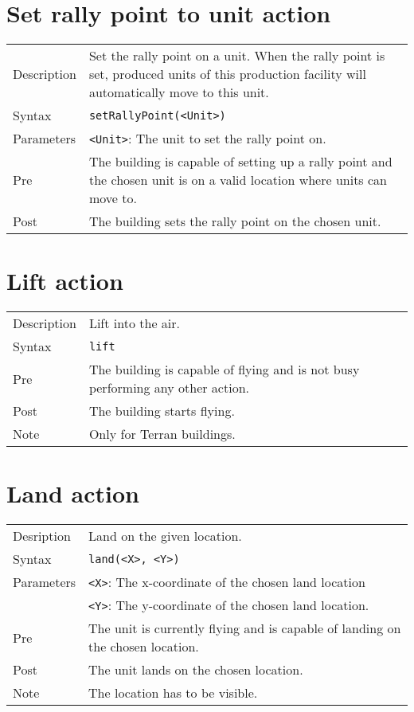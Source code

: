 \section{Set rally point to unit action}
\begin{tabularx}{\textwidth}{lX}
 Description & Set the rally point on a unit. When the rally point is set, produced units of this production facility will automatically move to this unit. \\
 Syntax & \verb|setRallyPoint(<Unit>)| \\
 Parameters & \verb|<Unit>|: The unit to set the rally point on.\\
 Pre & The building is capable of setting up a rally point and the chosen unit is on a valid location where units can move to. \\
 Post & The building sets the rally point on the chosen unit.
\end{tabularx}

\section{Lift action}
\begin{tabularx}{\textwidth}{lX}
 Description & Lift into the air. \\
 Syntax & \verb|lift| \\
 Pre & The building is capable of flying and is not busy performing any other action. \\
 Post & The building starts flying. \\
 Note & Only for Terran buildings.
\end{tabularx}

\section{Land action}
\begin{tabularx}{\textwidth}{lX}
 Desription & Land on the given location. \\
 Syntax & \verb|land(<X>, <Y>)| \\
 Parameters & \verb|<X>|: The x-coordinate of the chosen land location \\
            & \verb|<Y>|: The y-coordinate of the chosen land location. \\
 Pre & The unit is currently flying and is capable of landing on the chosen location. \\
 Post & The unit lands on the chosen location. \\
 Note & The location has to be visible.
\end{tabularx}

